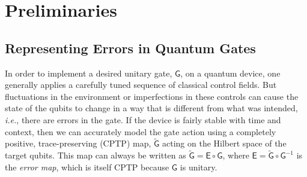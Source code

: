 \documentclass[aps,nofootinbib,pra,notitlepage,twocolumn]{revtex4-1}
\newcommand{\actual}{\ensuremath{\tilde{\mathsf{G}}}}
\newcommand{\target}{\ensuremath{{\mathsf{G}}}}
\newcommand{\error}{\ensuremath{{\mathsf{E}}}}
\newcommand{\0}{\ensuremath{\mathbf{0}}}
\begin{document}
\section{Preliminaries}
\label{sec:preliminaries}

\subsection{Representing Errors in Quantum Gates}
\label{sec:rep_errors}
\noindent In order to implement a desired unitary gate, $\target$, on a quantum device, one generally applies a carefully tuned sequence of classical control fields.  But fluctuations in the environment or imperfections in these controls can cause the state of the qubits to change in a way that is different from what was intended, \emph{i.e.}, there are errors in the gate. If the device is fairly stable with time\cite{1907.13608} and context\cite{Rudinger2019}, then we can accurately model the gate action using a completely positive, trace-preserving (CPTP) map, $\actual$ acting on the Hilbert space of the target qubits. This map can always be written as $\actual = \error\circ\target$, where $\error = \actual\circ\target^{-1}$ is the \emph{error map}, which is itself CPTP because $\target$ is unitary.
\end{document}
